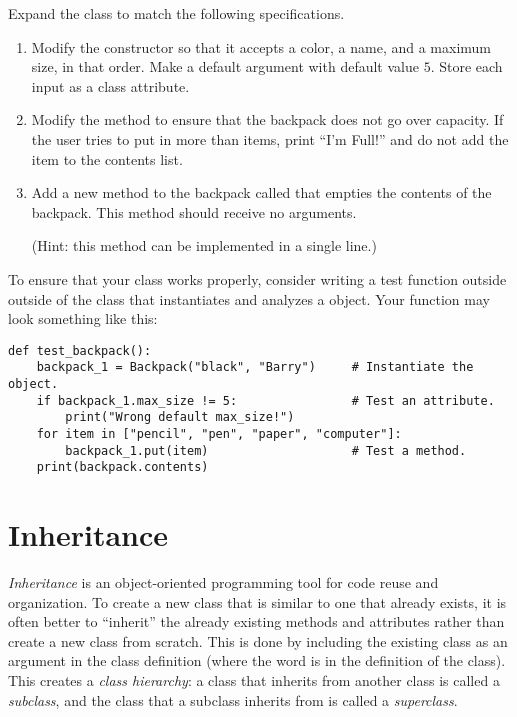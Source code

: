 \begin{problem}
Expand the  class to match the following specifications.
\begin{enumerate}
\item Modify the constructor so that it accepts a color, a name, and a maximum size, in that order.
Make  a default argument with default value $5$.
Store each input as a class attribute.

\item Modify the  method to ensure that the backpack does not go over capacity.
If the user tries to put in more than  items, print ``I'm Full!'' and do not add the item to the contents list.

\item Add a new method to the backpack called  that empties the contents of the backpack.
This method should receive no arguments.

(Hint: this method can be implemented in a single line.)
\end{enumerate}

To ensure that your class works properly, consider writing a test function outside outside of the  class that instantiates and analyzes a  object.
Your function may look something like this:
\begin{lstlisting}
def test_backpack():
    backpack_1 = Backpack("black", "Barry")     # Instantiate the object.
    if backpack_1.max_size != 5:                # Test an attribute.
        print("Wrong default max_size!")
    for item in ["pencil", "pen", "paper", "computer"]:
        backpack_1.put(item)                    # Test a method.
    print(backpack.contents)
\end{lstlisting}
\end{problem}


\section*{Inheritance}

\emph{Inheritance} is an object-oriented programming tool for code reuse and organization.
To create a new class that is similar to one that already exists, it is often better to ``inherit'' the already existing methods and attributes rather than create a new class from scratch.
This is done by including the existing class as an argument in the class definition (where the word  is in the definition of the  class).
This creates a \emph{class hierarchy}: a class that inherits from another class is called a \emph{subclass}, and the class that a subclass inherits from is called a \emph{superclass}.

